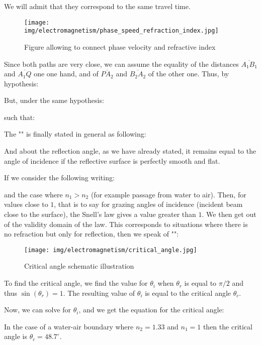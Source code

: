 	We will admit that they correspond to the same travel time.
	
	\begin{figure}[H]
		\centering
		\texttt{[image: img/electromagnetism/phase\_speed\_refraction\_index.jpg]}
		\caption{Figure allowing to connect phase velocity and refractive index}
	\end{figure}
	Since both paths are very close, we can assume the equality of the distances $\overline{A_1B_1}$ and $\overline{A_1Q}$ one one hand, and of $\overline{PA_2}$ and $\overline{B_2A_2}$ of the other one. Thus, by hypothesis:
	
	But, under the same hypothesis:
	
	such that:
	
	The "" is finally stated in general as following:
	
	And about the reflection angle, as we have already stated, it remains equal to the angle of incidence if the reflective surface is perfectly smooth and flat.
	
	If we consider the following writing:
	
	and the case where $n_1>n_2$ (for example passage from water to air). Then, for values close to $1$, that is to say for grazing angles of incidence (incident beam close to the surface), the Snell's law gives a value greater than $1$. We then get out of the validity domain of the law. This corresponds to situations where there is no refraction but only for reflection, then we speak of "":
	\begin{figure}[H]
		\centering
		\texttt{[image: img/electromagnetism/critical\_angle.jpg]}
		\caption{Critical angle schematic illustration}
	\end{figure}
	To find the critical angle, we find the value for $\theta_i$ when $\theta_r$ is equal to $\pi/2$ and thus $\sin(\theta _r)=1$. The resulting value of $\theta _i$ is equal to the critical angle $\theta_c$.

	Now, we can solve for $\theta_i$, and we get the equation for the critical angle:
	
	In the case of a water-air boundary where $n_2 = 1.33$ and $n_1=1$ then the critical angle is $\theta_c = 48.7^\circ$.
	
